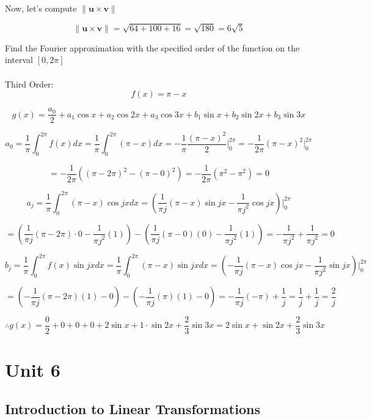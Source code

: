 \documentclass{report}
\begin{document}
Now, let's compute $\| \bm{u} \times \bm{v} \|$

$$
\| \bm{u} \times \bm{v} \| = \sqrt{64+100+16} = \sqrt{180} = 6\sqrt{5}
$$

\begin{tcolorbox}[colframe = lightred]
	Find the Fourier approximation with the specified order of the function on the interval $[0,2\pi]$\\\\
	
	Third Order: 
	$$
	f(x) = \pi - x 
	$$
\end{tcolorbox}

$$
g(x) = \frac{a_0}{2} + a_1 \cos x + a_2 \cos 2x + a_3 \cos 3x + b_1 \sin x + b_2 \sin 2x + b_3 \sin 3x
$$

$$
a_0 = \frac{1}{\pi} \int_0^{2\pi} f(x)dx = \frac{1}{\pi} \int_0^{2\pi} (\pi - x)dx = -\frac{1}{\pi} \frac{(\pi-x)^2}{2} \Big|_0^{2\pi} = -\frac{1}{2\pi} (\pi - x)^2 \Big|_0^{2\pi}
$$

$$
= - \frac{1}{2\pi} \left( (\pi - 2\pi)^2 - (\pi - 0)^2 \right) = -\frac{1}{2\pi} (\pi^2 - \pi^2) = 0
$$

$$
a_{j} = \frac{1}{\pi} \int_0^{2\pi} (\pi - x)\cos jx dx = \left( \frac{1}{\pi j} (\pi - x) \sin jx - \frac{1}{\pi j^2} \cos jx \right) \Big|_0^{2\pi}
$$

$$
= \left( \frac{1}{\pi j} (\pi - 2 \pi) \cdot 0 - \frac{1}{\pi j^2} (1) \right) - \left( \frac{1}{\pi j}(\pi - 0)(0) - \frac{1}{\pi j^2} (1) \right) = -\frac{1}{\pi j^2} + \frac{1}{\pi j^2} = 0
$$

$$
b_{j} = \frac{1}{\pi} \int_0^{2\pi} f(x) \sin jx dx = \frac{1}{\pi} \int_0^{2\pi} (\pi - x) \sin jx dx =  \left( -\frac{1}{\pi j} (\pi - x) \cos jx - \frac{1}{\pi j^2} \sin jx \right) \Big|_0^{2\pi}
$$

$$
= \left( -\frac{1}{\pi j} (\pi - 2\pi) (1) - 0 \right) - \left( -\frac{1}{\pi j} (\pi) (1) - 0 \right) = -\frac{1}{\pi j} (-\pi) + \frac{1}{j} = \frac{1}{j} + \frac{1}{j} = \frac{2}{j}
$$

$$
\therefore g(x) = \frac{0}{2} + 0 + 0 + 0 + 2\sin x + 1 \cdot \sin 2x + \frac{2}{3} \sin 3x =  2 \sin x + \sin 2x + \frac{2}{3} \sin 3x
$$

\chapter{Unit 6}

\section{Introduction to Linear Transformations}
\end{document}
